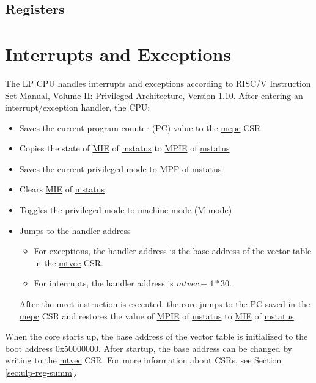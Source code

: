 \documentclass[main\_\_EN.tex]{subfiles}
\begin{document}
\subsection{Registers}




\section{Interrupts and Exceptions}

The LP CPU handles interrupts and exceptions according to RISC\-/V Instruction Set Manual, Volume II: Privileged Architecture, Version 1.10. After entering an interrupt/exception handler, the CPU:
\begin{itemize}
    \item Saves the current program counter (PC) value to the \hyperref[regdesc:LPMEPC]{mepc} CSR
    \item Copies the state of \hyperref[fielddesc:LPMSTATUSMIE]{MIE} of \hyperref[regdesc:LPMSTATUS]{mstatus} to \hyperref[fielddesc:LPMSTATUSMPIE]{MPIE} of \hyperref[regdesc:LPMSTATUS]{mstatus}
    \item Saves the current privileged mode to \hyperref[fielddesc:LPMSTATUSMPP]{MPP} of \hyperref[regdesc:LPMSTATUS]{mstatus}
    \item Clears \hyperref[fielddesc:LPMSTATUSMIE]{MIE} of \hyperref[regdesc:LPMSTATUS]{mstatus}
    \item Toggles the privileged mode to machine mode (M mode)
    \item Jumps to the handler address
        \begin{itemize}
            \item For exceptions, the handler address is the base address of the vector table in the \hyperref[regdesc:LPMTVEC]{mtvec} CSR.
            \item For interrupts, the handler address is $mtvec + 4*30$.
        \end{itemize}
    After the mret instruction is executed, the core jumps to the PC saved in the \hyperref[regdesc:LPMEPC]{mepc} CSR and restores the value of \hyperref[fielddesc:LPMSTATUSMPIE]{MPIE} of \hyperref[regdesc:LPMSTATUS]{mstatus} to \hyperref[fielddesc:LPMSTATUSMIE]{MIE} of \hyperref[regdesc:LPMSTATUS]{mstatus} .
\end{itemize}

When the core starts up, the base address of the vector table is initialized to the boot address 0x50000000. After startup, the base address can be changed by writing to the \hyperref[regdesc:LPMTVEC]{mtvec} CSR. For more information about CSRs, see Section \ref{sec:ulp-reg-summ}.
\end{document}
